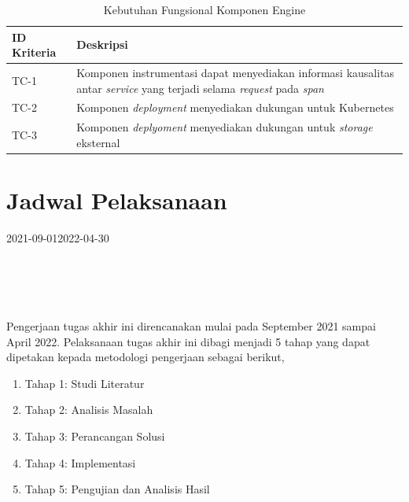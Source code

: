 \begin{small}
	\begin{longtable}{ | p{3cm} | p{10cm} |}
		\caption{Kebutuhan Fungsional Komponen Engine}
		\label{ch3-func-engine}                                                           
		\\ \hline
		\centering\bfseries{ID Kriteria} & \centering\bfseries{Deskripsi} \tabularnewline \hline
		\endfirsthead
		TC-1 & Komponen instrumentasi dapat menyediakan informasi kausalitas antar \textit{service} yang terjadi selama \textit{request} pada \textit{span} \\ \hline
		TC-2 & Komponen \textit{deployment} menyediakan dukungan untuk Kubernetes \\ \hline
		TC-3 & Komponen \textit{deplyoment} menyediakan dukungan untuk \textit{storage} eksternal \\ \hline
	\end{longtable}
\end{small}

\section{Jadwal Pelaksanaan}
 
 \newsavebox\mybox
 \begin{lrbox}{\mybox}
	     \begin{ganttchart}[
		     vgrid={*{6}{draw=none}, dotted},
		     x unit=.05cm,
		     y unit title=.6cm,
		     y unit chart=.6cm,
		     time slot format=isodate,
		     time slot format/start date=2016-09-01]{2021-09-01}{2022-04-30}
		      \\
		     \\
		     \\
		     \\
		     \\
		     \end{ganttchart}
	 \end{lrbox}

 Pengerjaan tugas akhir ini direncanakan mulai pada September 2021 sampai April 2022. Pelaksanaan tugas akhir ini dibagi menjadi 5 tahap yang dapat dipetakan kepada metodologi pengerjaan sebagai berikut,
 \begin{enumerate}
	     \item Tahap 1: Studi Literatur
	     \item Tahap 2: Analisis Masalah
	     \item Tahap 3: Perancangan Solusi
	     \item Tahap 4: Implementasi
	     \item Tahap 5: Pengujian dan Analisis Hasil
	 \end{enumerate}
 
